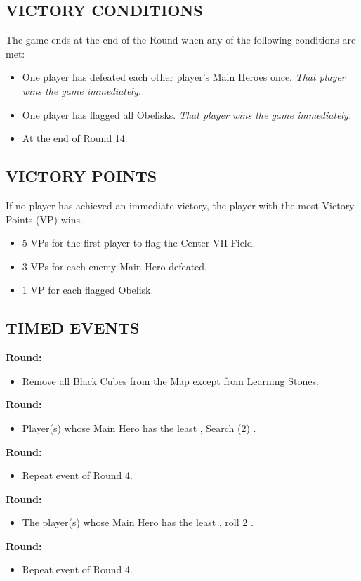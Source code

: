 \begin{multicols}{2}
\subsection*{\MakeUppercase{Victory Conditions}}
The game ends at the end of the Round when any of the following conditions are met:

\begin{itemize}
  \item One player has defeated each other player's Main Heroes once. \textit{That player wins the game immediately.}
  \item One player has flagged all Obelisks. \textit{That player wins the game immediately.}
  \item At the end of Round 14.
\end{itemize}

\subsection*{\MakeUppercase{Victory Points}}
If no player has achieved an immediate victory, the player with the most Victory Points (VP) wins.

\begin{itemize}
  \item 5 VPs for the first player to flag the Center VII Field.
  \item 3 VPs for each enemy Main Hero defeated.
  \item 1 VP for each flagged Obelisk.
\end{itemize}

\subsection*{\MakeUppercase{Timed Events}}
\textbf{ Round:}
\begin{itemize}
  \item Remove all Black Cubes from the Map except from Learning Stones.
\end{itemize}
\textbf{ Round:}
\begin{itemize}
  \item Player(s) whose Main Hero has the least , Search (2) .
\end{itemize}
\textbf{ Round:}
\begin{itemize}
  \item Repeat event of Round 4.
\end{itemize}
\textbf{ Round:}
\begin{itemize}
  \item The player(s) whose Main Hero has the least , roll 2 .
\end{itemize}
\textbf{ Round:}
\begin{itemize}
  \item Repeat event of Round 4.
\end{itemize}


\end{multicols}
